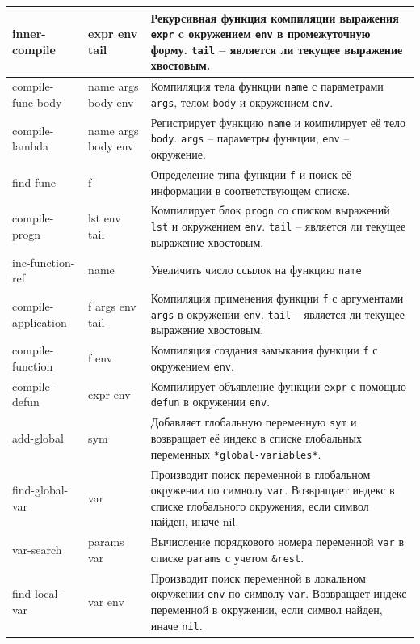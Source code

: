 \begin{xltabular}{\textwidth}{|p{2.5cm}|p{2.5cm}|X|}
	inner-compile & expr env tail & Рекурсивная функция компиляции выражения \texttt{expr} c окружением \texttt{env} в промежуточную форму. \texttt{tail} -- является ли текущее выражение хвостовым. \\ \hline
	compile-func-body & name args body env & Компиляция тела функции \texttt{name} с параметрами \texttt{args}, телом \texttt{body} и окружением \texttt{env}. \\ \hline
	compile-lambda & name args body env & Регистрирует функцию \texttt{name} и компилирует её тело \texttt{body}. \texttt{args} -- параметры функции, \texttt{env} -- окружение. \\ \hline
	find-func & f &  Определение типа функции \texttt{f} и поиск её информации в соответствующем списке. \\ \hline
	compile-progn & lst env tail & Компилирует блок \texttt{progn} со списком выражений \texttt{lst} и окружением \texttt{env}. \texttt{tail} -- является ли текущее выражение хвостовым. \\ \hline
	inc-function-ref & name & Увеличить число ссылок на функцию \texttt{name} \\ \hline
	compile-application & f args env tail & Компиляция применения функции \texttt{f} с аргументами \texttt{args} в окружении \texttt{env}. \texttt{tail} -- является ли текущее выражение хвостовым. \\ \hline
	compile-function & f env & Компиляция создания замыкания функции \texttt{f} с окружением \texttt{env}. \\ \hline
	compile-defun & expr env & Компилирует объявление функции \texttt{expr} с помощью \texttt{defun} в окружении \texttt{env}. \\ \hline
	add-global & sym & Добавляет глобальную переменную \texttt{sym} и возвращает её индекс в списке глобальных переменных \texttt{*global-variables*}. \\ \hline
	find-global-var & var & Производит поиск переменной в глобальном окружении по символу \texttt{var}. Возвращает индекс в списке глобального окружения, если символ найден, иначе nil. \\ \hline
	var-search & params var & Вычисление порядкового номера переменной \texttt{var} в списке \texttt{params} с учетом \texttt{\&rest}. \\ \hline
	find-local-var & var env & Производит поиск переменной в локальном окружении \texttt{env} по символу \texttt{var}. Возвращает индекс переменной в окружении, если символ найден, иначе \texttt{nil}. \\ \hline

\end{xltabular}

